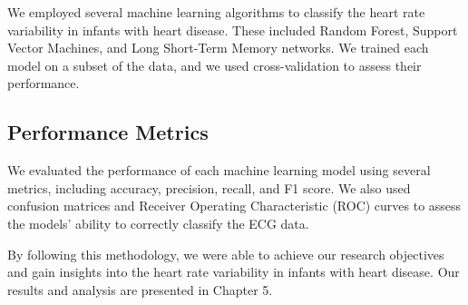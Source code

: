 We employed several machine learning algorithms to classify the heart rate variability in infants with heart disease. These included Random Forest, Support Vector Machines, and Long Short-Term Memory networks. We trained each model on a subset of the data, and we used cross-validation to assess their performance.

\subsection{Performance Metrics}

We evaluated the performance of each machine learning model using several metrics, including accuracy, precision, recall, and F1 score. We also used confusion matrices and Receiver Operating Characteristic (ROC) curves to assess the models' ability to correctly classify the ECG data.

By following this methodology, we were able to achieve our research objectives and gain insights into the heart rate variability in infants with heart disease. Our results and analysis are presented in Chapter 5.


